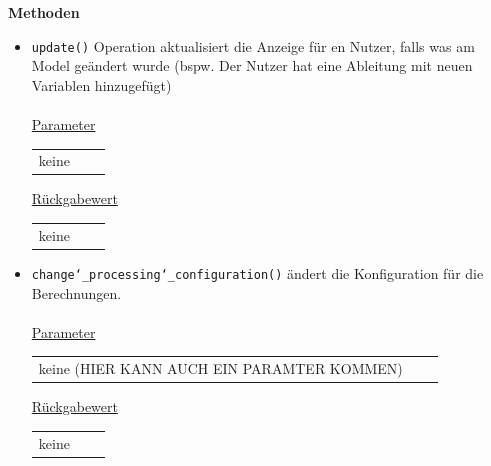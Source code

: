 \documentclass{article}
\begin{document}
\textbf{{Methoden}}
\begin{itemize}
\item \texttt{update()} \newline Operation aktualisiert die Anzeige für en Nutzer, falls was am Model geändert wurde (bspw. Der Nutzer hat eine  Ableitung mit neuen Variablen hinzugefügt)
\\\\
\underline{{Parameter}} 
\begin{tabular}{lll}
keine
\end{tabular}

\underline{{Rückgabewert}}
\begin{tabular}{lll}
keine
\end{tabular}
\item \texttt{change\char`_processing\char`_configuration()} \newline ändert die Konfiguration für die Berechnungen.
\\\\
\underline{{Parameter}} 
\begin{tabular}{lll}
keine (HIER KANN AUCH EIN PARAMTER KOMMEN)
\end{tabular}

\underline{{Rückgabewert}}
\begin{tabular}{lll}
keine
\end{tabular}
\end{itemize}
\end{document}
